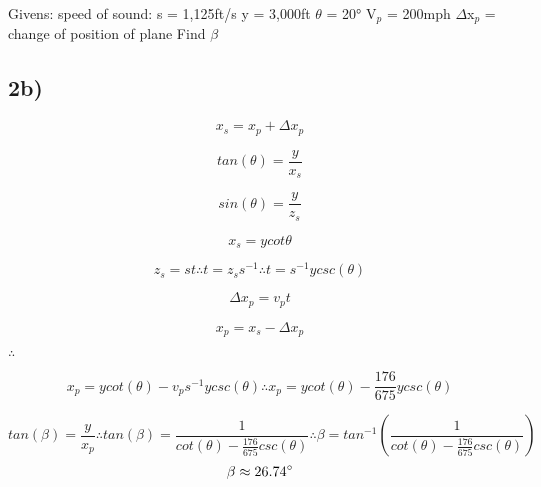 \documentclass{article}
\begin{document}
Givens:
\newline speed of sound: s = 1,125ft/s
\newline y = 3,000ft
\newline $\theta$ = 20°
\newline V$_{p}$ = 200mph
\newline $\Delta$x$_{p}$ = change of position of plane
\newline Find $\beta$

\subsection*{2b)}

\begin{equation}
    x_{s} = x_{p} + \Delta x_{p}
\end{equation}

\begin{equation}
    tan(\theta) = \frac{y}{x_{s}}
\end{equation}

\begin{equation}
    sin(\theta) = \frac{y}{z_{s}}
\end{equation}

\begin{equation}
    x_{s} = ycot{\theta}
\end{equation}

\begin{equation}
    z_{s} = st \therefore t = z_{s}s^{-1} \therefore t = s^{-1}ycsc(\theta)
\end{equation}

\begin{equation}
    \Delta x_{p} = v_{p}t
\end{equation}

\begin{equation}
    x_{p} = x_{s} - \Delta x_{p}
\end{equation}

$\therefore$

\begin{equation}
    x_{p} = ycot(\theta) - v_{p}s^{-1}ycsc(\theta) \therefore x_{p} = ycot(\theta) - \frac{176}{675}ycsc(\theta)
\end{equation}

\begin{equation}
    tan(\beta) = \frac{y}{x_{p}} \therefore tan(\beta) = \frac{1}{cot(\theta)-\frac{176}{675}csc(\theta)} \therefore \beta = tan^{-1} (\frac{1}{cot(\theta)-\frac{176}{675}csc(\theta)})
\end{equation}
\begin{equation}
    \beta \approx 26.74\degree    
\end{equation}
\end{document}
